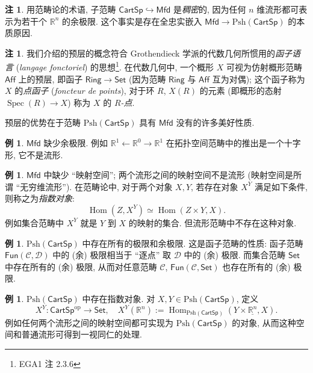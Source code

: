 \documentclass{article}
\theoremstyle{definition}
\newtheorem{example}[definition]{例}
\newtheorem{remark}[definition]{注}
\newcommand{\CartSp}{\mathsf{CartSp}}
\newcommand{\Set}{\mathsf{Set}}
\newcommand{\Mfd}{\mathsf{Mfd}}
\newcommand{\op}{\mathrm{op}}
\newcommand{\Psh}{\mathrm{Psh}}
\begin{document}
	\begin{remark}
		用范畴论的术语, 子范畴 $\CartSp\hookrightarrow\Mfd$ 是\emph{稠密}的, 因为任何 $n$ 维流形都可表示为若干个 $\mathbb{R}^n$ 的余极限. 这个事实是存在全忠实嵌入 $\Mfd\to\Psh(\CartSp)$ 的本质原因.
	\end{remark}
	
	\begin{remark}
		我们介绍的预层的概念符合 Grothendieck 学派的代数几何所惯用的\emph{函子语言} (\emph{langage fonctoriel}) 的思想\footnote{EGA1 注 2.3.6}. 在代数几何中, 一个概形 $X$ 可视为仿射概形范畴 $\mathsf {Aff}$ 上的预层, 即函子 $\mathsf {Ring}\to\Set$ (因为范畴 $\mathsf {Ring}$ 与 $\mathsf {Aff}$ 互为对偶); 这个函子称为 $X$ 的\emph{点函子} (\emph{foncteur de points}), 对于环 $R$, $X(R)$ 的元素 (即概形的态射 $\operatorname{Spec}(R)\to X$) 称为 $X$ 的 \emph{$R$-点}.
	\end{remark}
	
	预层的优势在于范畴 $\Psh(\CartSp)$ 具有 $\Mfd$ 没有的许多美好性质.
	
	\begin{example}
		$\Mfd$ 缺少余极限. 例如 $\mathbb{R}^1\leftarrow \mathbb{R}^0\to\mathbb{R}^1$ 在拓扑空间范畴中的推出是一个十字形, 它不是流形.
	\end{example}
	
	\begin{example}
		$\Mfd$ 中缺少 ``映射空间''; 两个流形之间的映射空间不是流形 (映射空间是所谓 ``无穷维流形'').
		在范畴论中, 对于两个对象 $X,Y$, 若存在对象 $X^Y$ 满足如下条件, 则称之为\emph{指数对象}:
		$$
		\operatorname{Hom}(Z,X^Y)\simeq\operatorname{Hom}(Z\times Y,X).
		$$
		例如集合范畴中 $X^Y$ 就是 $Y$ 到 $X$ 的映射的集合. 但流形范畴中不存在这种对象.
	\end{example}
	
	\begin{example}
		$\Psh(\CartSp)$ 中存在所有的极限和余极限. 这是函子范畴的性质: 函子范畴 $\mathsf{Fun}(\mathcal C,\mathcal D)$ 中的 (余) 极限相当于 ``逐点'' 取 $\mathcal D$ 中的 (余) 极限. 而集合范畴 $\Set$ 中存在所有的 (余) 极限, 从而对任意范畴 $\mathcal C$, $\mathsf{Fun}(\mathcal C,\Set)$ 也存在所有的 (余) 极限.
	\end{example}
	
	\begin{example}
		$\Psh(\CartSp)$ 中存在指数对象. 对 $X,Y\in\Psh(\CartSp)$, 定义
		$$
		X^Y\colon \CartSp^{\op}\to\Set,\quad
		X^Y(\mathbb{R}^n) := \operatorname{Hom}_{\Psh(\CartSp)}(Y\times\underline{\mathbb{R}^n},X).
		$$
		例如任何两个流形之间的映射空间都可实现为 $\Psh(\CartSp)$ 的对象, 从而这种空间和普通流形可得到一视同仁的处理.
	\end{example}
	
\end{document}
